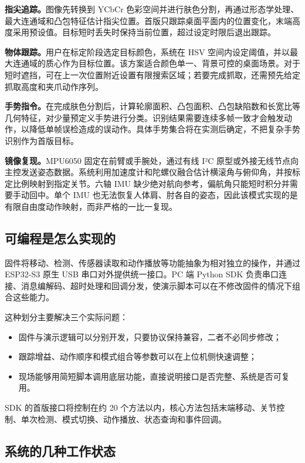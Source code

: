 \textbf{指尖追踪。}图像先转换到 YCbCr 色彩空间并进行肤色分割，再通过形态学处理、最大连通域和凸包特征估计指尖位置。首版只跟踪桌面平面内的位置变化，末端高度采用预设值。目标短时丢失时保持当前位置，超过设定时限后退出跟踪。

\textbf{物体跟踪。}用户在标定阶段选定目标颜色，系统在 HSV 空间内设定阈值，并以最大连通域的质心作为目标位置。该方案适合颜色单一、背景可控的桌面场景。对于短时遮挡，可在上一次位置附近设置有限搜索区域；若要完成抓取，还需预先给定抓取高度和夹爪动作序列。

\textbf{手势指令。}在完成肤色分割后，计算轮廓面积、凸包面积、凸包缺陷数和长宽比等几何特征，对少量预定义手势进行分类。识别结果需要连续多帧一致才会触发动作，以降低单帧误检造成的误动作。具体手势集合将在实测后确定，不把复杂手势识别作为首版目标。

\textbf{镜像复现。}MPU6050 固定在前臂或手腕处，通过有线 I²C 原型或外接无线节点向主控发送姿态数据。系统利用加速度计和陀螺仪融合估计横滚角与俯仰角，并按标定比例映射到指定关节。六轴 IMU 缺少绝对航向参考，偏航角只能短时积分并需要手动回中。单个 IMU 也无法恢复人体肩、肘各自的姿态，因此该模式实现的是有限自由度动作映射，而非严格的一比一复现。

\subsection{可编程是怎么实现的}

固件将移动、检测、传感器读取和动作播放等功能抽象为相对独立的操作，并通过 ESP32-S3 原生 USB 串口对外提供统一接口。PC 端 Python SDK 负责串口连接、消息编解码、超时处理和回调分发，使演示脚本可以在不修改固件的情况下组合这些能力。

这种划分主要解决三个实际问题：

\begin{itemize}
  \item 固件与演示逻辑可以分别开发，只要协议保持兼容，二者不必同步修改；
  \item 跟踪增益、动作顺序和模式组合等参数可以在上位机侧快速调整；
  \item 现场能够用简短脚本调用底层功能，直接说明接口是否完整、系统是否可复用。
\end{itemize}

SDK 的首版接口将控制在约 20 个方法以内，核心方法包括末端移动、关节控制、单次检测、模式切换、动作播放、状态查询和事件回调。

\subsection{系统的几种工作状态}

